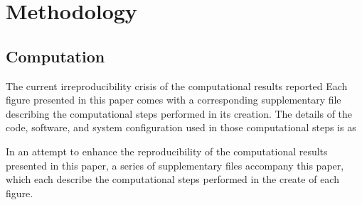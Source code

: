\section{Methodology}\label{s:methodology}

\subsection{Computation}\label{s:computation}

The current irreproducibility crisis  of the computational results reported 
Each figure presented in this paper comes with a corresponding supplementary file describing the computational steps performed in its creation. The details of the code, software, and system configuration used in those computational steps is as


In an attempt to enhance the reproducibility of the computational results presented in this paper, a series of supplementary files accompany this paper, which each describe the computational steps performed in the create of each figure.    